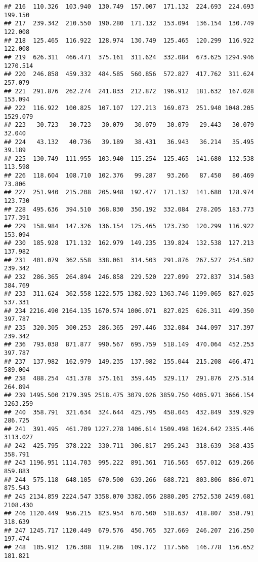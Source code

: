 \documentclass[
]{article}
\begin{document}
\begin{verbatim}
## 216  110.326  103.940  130.749  157.007  171.132  224.693  224.693  199.150
## 217  239.342  210.550  190.280  171.132  153.094  136.154  130.749  122.008
## 218  125.465  116.922  128.974  130.749  125.465  120.299  116.922  122.008
## 219  626.311  466.471  375.161  311.624  332.084  673.625 1294.946 1270.514
## 220  246.858  459.332  484.585  560.856  572.827  417.762  311.624  257.079
## 221  291.876  262.274  241.833  212.872  196.912  181.632  167.028  153.094
## 222  116.922  100.825  107.107  127.213  169.073  251.940 1048.205 1529.079
## 223   30.723   30.723   30.079   30.079   30.079   29.443   30.079   32.040
## 224   43.132   40.736   39.189   38.431   36.943   36.214   35.495   39.189
## 225  130.749  111.955  103.940  115.254  125.465  141.680  132.538  113.598
## 226  118.604  108.710  102.376   99.287   93.266   87.450   80.469   73.806
## 227  251.940  215.208  205.948  192.477  171.132  141.680  128.974  123.730
## 228  495.636  394.510  368.830  350.192  332.084  278.205  183.773  177.391
## 229  158.984  147.326  136.154  125.465  123.730  120.299  116.922  153.094
## 230  185.928  171.132  162.979  149.235  139.824  132.538  127.213  137.982
## 231  401.079  362.558  338.061  314.503  291.876  267.527  254.502  239.342
## 232  286.365  264.894  246.858  229.520  227.099  272.837  314.503  384.769
## 233  311.624  362.558 1222.575 1382.923 1363.746 1199.065  827.025  537.331
## 234 2216.490 2164.135 1670.574 1006.071  827.025  626.311  499.350  397.787
## 235  320.305  300.253  286.365  297.446  332.084  344.097  317.397  239.342
## 236  793.038  871.877  990.567  695.759  518.149  470.064  452.253  397.787
## 237  137.982  162.979  149.235  137.982  155.044  215.208  466.471  589.004
## 238  488.254  431.378  375.161  359.445  329.117  291.876  275.514  264.894
## 239 1495.500 2179.395 2518.475 3079.026 3859.750 4005.971 3666.154 3263.259
## 240  358.791  321.634  324.644  425.795  458.045  432.849  339.929  286.725
## 241  391.495  461.709 1227.278 1406.614 1509.498 1624.642 2335.446 3113.027
## 242  425.795  378.222  330.711  306.817  295.243  318.639  368.435  358.791
## 243 1196.951 1114.703  995.222  891.361  716.565  657.012  639.266  859.883
## 244  575.118  648.105  670.500  639.266  688.721  803.806  886.071  875.543
## 245 2134.859 2224.547 3358.070 3382.056 2880.205 2752.530 2459.681 2108.430
## 246 1120.449  956.215  823.954  670.500  518.637  418.807  358.791  318.639
## 247 1245.717 1120.449  679.576  450.765  327.669  246.207  216.250  197.474
## 248  105.912  126.308  119.286  109.172  117.566  146.778  156.652  181.821

\end{verbatim}
\end{document}
